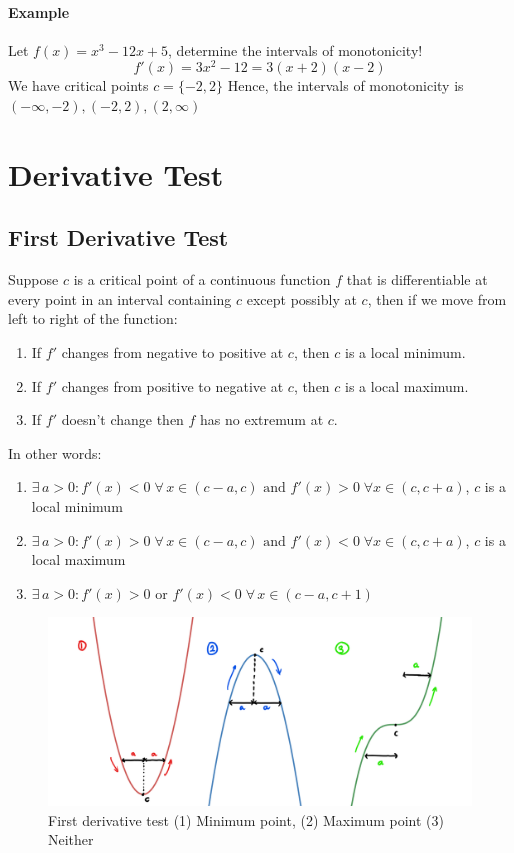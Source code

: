 \documentclass[12pt]{article}
\begin{document}
\paragraph{Example} Let $f(x) = x^3 - 12x + 5$, determine the intervals of monotonicity!
\[
    f'(x) = 3x^2 - 12 = 3(x + 2)(x - 2)
\]
We have critical points $c = \{-2, 2\}$
Hence, the intervals of monotonicity is $(-\infty, -2), (-2, 2), (2, \infty)$ 
\section{Derivative Test}
\subsection{First Derivative Test}
Suppose $c$ is a critical point of a continuous function $f$ that is differentiable at 
every point in an interval containing $c$ except possibly at $c$, then if we move from left to right 
of the function:
\begin{enumerate} 
     \item If $f'$ changes from negative to positive at $c$, then $c$ is a local minimum.
     \item If $f'$ changes from positive to negative at $c$, then $c$ is a local maximum.
     \item If $f'$ doesn't change then $f$ has no extremum at $c$.
\end{enumerate}
In other words:
\begin{enumerate} 
    \item $\exists \, a > 0 : f'(x) < 0 \; \forall \, x \in (c - a, c) \textrm{ and }  f'(x) > 0 \; \forall x \in (c, c + a)$, $c$ is a local minimum
    \item $\exists \, a > 0 : f'(x) > 0 \; \forall \, x \in (c - a, c) \textrm{ and }  f'(x) < 0 \; \forall x \in (c, c + a)$, $c$ is a local maximum
    \item $\exists \, a > 0 : f'(x) > 0 \textrm{ or } f'(x) < 0 \; \forall \, x \in (c - a, c + 1)$
\end{enumerate}

\begin{figure}[h!]
    \centering
    \includegraphics[width = 0.8\linewidth]{Images/first derivative test.png}
    \caption{First derivative test (1) Minimum point, (2) Maximum point (3) Neither}
\end{figure}
\end{document}
